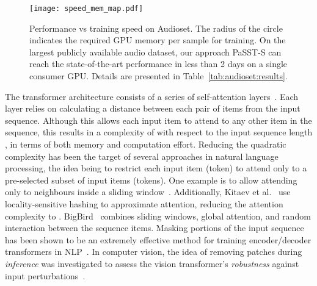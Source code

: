 \documentclass[a4paper]{article}
\begin{document}
\begin{figure}[tb]
\centering
\centerline{\texttt{[image: speed\_mem\_map.pdf]}}
\caption{Performance vs training speed on Audioset. The radius of the circle indicates the required GPU memory per sample for training. On the largest publicly available audio dataset, our approach PaSST-S can reach the state-of-the-art performance in less than 2 days on a single consumer GPU. Details are presented in Table~\ref{tab:audioset:results}.}

\label{fig:res}
\end{figure}

The transformer architecture consists of a series of self-attention layers~\cite{vaswani2017attention}. Each layer relies on calculating a distance between each pair of items from the input sequence. Although this allows each input item to attend to any other item in the sequence, this results in a complexity of  with respect to the input sequence length , in terms of both memory and computation effort. Reducing the quadratic complexity has been the target of several approaches in natural language processing, the idea being to restrict each input item (token) to attend only to a pre-selected subset of input items (tokens). One example is to allow attending only to neighbours inside a sliding window~\cite{WangNMNX19MultipassageBert,SukhbaatarGBJ19adaptivespan}. Additionally, Kitaev et al.~\cite{KitaevKL20reformer} use locality-sensitive hashing to approximate attention, reducing the attention complexity to . BigBird~\cite{ZaheerGDAAOPRWY20bigbird} combines sliding windows, global attention, and random interaction between the sequence items. Masking portions of the input sequence has been shown to be an extremely effective method for training encoder/decoder transformers in NLP~\cite{devlinCLT19bert}. In computer vision, the idea of removing patches during \emph{inference} was investigated to assess the vision transformer's \emph{robustness} against input perturbations~\cite{naseer2021Intriguing}. 
\end{document}
